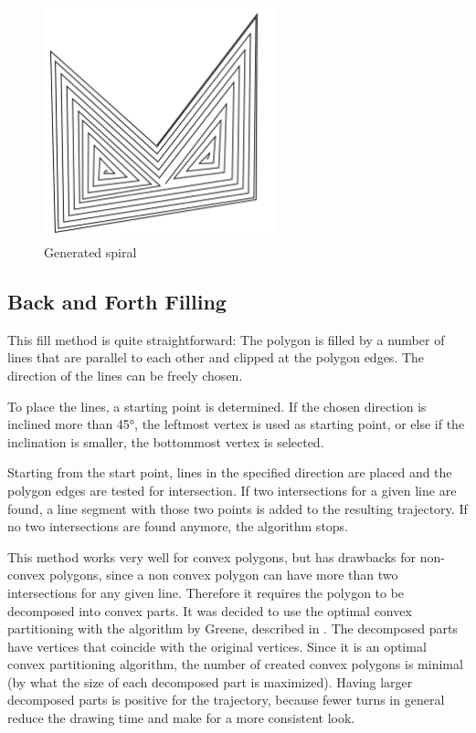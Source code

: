 \begin{figure}
\centering
\includegraphics[width=0.6\textwidth]{images/algorithms/spiral_fill/spiral_real.pdf}
\caption{Generated spiral} \label{fig:gen_spiral}
\end{figure}

\subsection{Back and Forth Filling}

This fill method is quite straightforward: The polygon is filled by a number of lines that are parallel to each other and clipped at the polygon edges. The direction of the lines can be freely chosen.

To place the lines, a starting point is determined. If the chosen direction is inclined more than 45°, the leftmost vertex is used as starting point, or else if the inclination is smaller, the bottommost vertex is selected.

Starting from the start point, lines in the specified direction are placed and the polygon edges are tested for intersection. If two intersections for a given line are found, a line segment with those two points is added to the resulting trajectory. If no two intersections are found anymore, the algorithm stops.

This method works very well for convex polygons, but has drawbacks for non-convex polygons, since a non convex polygon can have more than two intersections for any given line. Therefore it requires the polygon to be decomposed into convex parts. It was decided to use the optimal convex partitioning with the algorithm by Greene, described in \citet{greene1983decomposition}. The decomposed parts have vertices that coincide with the original vertices. Since it is an optimal convex partitioning algorithm, the number of created convex polygons is minimal (by what the size of each decomposed part is maximized). Having larger decomposed parts is positive for the trajectory, because fewer turns in general reduce the drawing time and make for a more consistent look.

